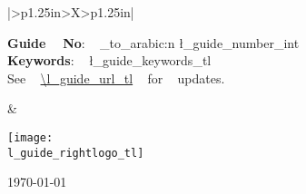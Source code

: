 {\begin{tabularx}{\textwidth}{|>{\centering\arraybackslash}p{1.25in}>{\centering\arraybackslash}X>{\raggedleft\arraybackslash}p{1.25in}|}
\begin{minipage}[c][1\totalheight][b]{3.5in}
      \begin{flushleft}
        {\small{}\textbf{Guide ~ No}: ~ \int_to_arabic:n { \l_guide_number_int  }}\\
        \textbf{Keywords}: ~ \l_guide_keywords_tl \\
        See ~ \url{\l_guide_url_tl} ~ for ~ updates.
        \par
      \end{flushleft}
      \smallskip
    \end{minipage} & 
    \begin{minipage}[c]{\linewidth}
      \smallskip
      \par
      \begin{center}
        \texttt{[image: \\l\_guide\_rightlogo\_tl]}
        \par
      \end{center}
      {\Huge \par}
    \end{minipage}
    \par
    \begin{minipage}[c]{\linewidth}
      \smallskip
      \begin{center}
        \today
        \par
      \end{center}
    \end{minipage}
    \tabularnewline
    \hline 
  \end{tabularx}
}
\ExplSyntaxOff


\usepackage{fancyhdr}
\usepackage{lastpage}

